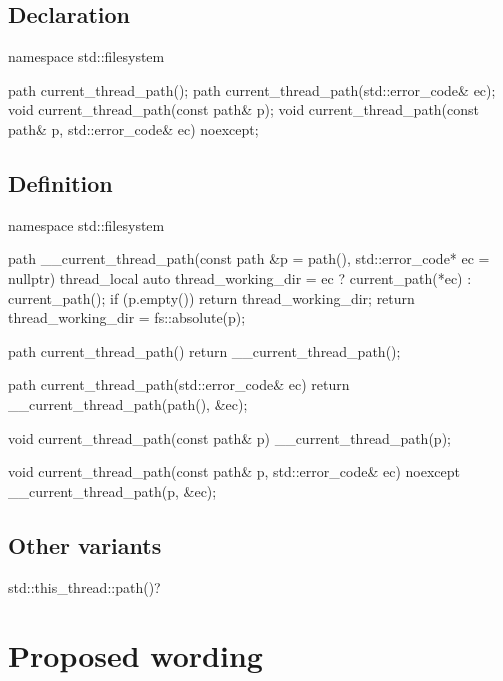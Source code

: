 \documentclass{wg21}
\begin{document}
\subsection{Declaration}

\begin{cpp}
namespace std::filesystem
{

    path current_thread_path();
    path current_thread_path(std::error_code& ec);
    void current_thread_path(const path& p);
    void current_thread_path(const path& p, std::error_code& ec) noexcept;

}
\end{cpp}

\subsection{Definition}

\begin{cpp}
namespace std::filesystem
{

    path __current_thread_path(const path &p = path(), std::error_code* ec = nullptr)
    {
        thread_local auto thread_working_dir = ec ? current_path(*ec) : current_path();
        if (p.empty())
            return thread_working_dir;
        return thread_working_dir = fs::absolute(p);
    }
    
    path current_thread_path()
    {
        return __current_thread_path();
    }
    
    path current_thread_path(std::error_code& ec)
    {
        return __current_thread_path(path(), &ec);
    }
    
    void current_thread_path(const path& p)
    {
        __current_thread_path(p);
    }
    
    void current_thread_path(const path& p, std::error_code& ec) noexcept
    {
        __current_thread_path(p, &ec);
    }

}
\end{cpp}


\subsection{Other variants}

\begin{cpp}
std::this_thread::path()?
\end{cpp}


\section{Proposed wording}
\end{document}
